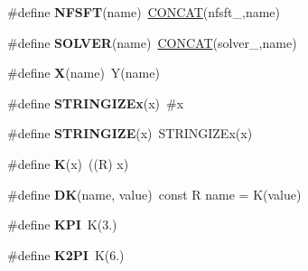 \begin{DoxyCompactItemize}
\item 
\hypertarget{group__nfftutil_gab3034d3ae1e6ab2dbc3aa6b640129338}{\#define {\bfseries N\-F\-S\-F\-T}(name)~\hyperlink{solver_8c_a04583350aeb5e936b6fb328093ad4e62}{C\-O\-N\-C\-A\-T}(nfsft\-\_\-,name)}\label{group__nfftutil_gab3034d3ae1e6ab2dbc3aa6b640129338}

\item 
\hypertarget{group__nfftutil_gaa98506b3390ef8e18f71ace66666d858}{\#define {\bfseries S\-O\-L\-V\-E\-R}(name)~\hyperlink{solver_8c_a04583350aeb5e936b6fb328093ad4e62}{C\-O\-N\-C\-A\-T}(solver\-\_\-,name)}\label{group__nfftutil_gaa98506b3390ef8e18f71ace66666d858}

\item 
\hypertarget{group__nfftutil_ga826edd40636cbaa44266b97c8c6a4fa3}{\#define {\bfseries X}(name)~Y(name)}\label{group__nfftutil_ga826edd40636cbaa44266b97c8c6a4fa3}

\item 
\hypertarget{group__nfftutil_ga7731fa5d9e9881a5be7b5ca52849f404}{\#define {\bfseries S\-T\-R\-I\-N\-G\-I\-Z\-Ex}(x)~\#x}\label{group__nfftutil_ga7731fa5d9e9881a5be7b5ca52849f404}

\item 
\hypertarget{group__nfftutil_ga3428692efe6051ef30016ffde1a9f7bb}{\#define {\bfseries S\-T\-R\-I\-N\-G\-I\-Z\-E}(x)~S\-T\-R\-I\-N\-G\-I\-Z\-Ex(x)}\label{group__nfftutil_ga3428692efe6051ef30016ffde1a9f7bb}

\item 
\hypertarget{group__nfftutil_gae5f839eceb66b42fe692d366c93a5bcc}{\#define {\bfseries K}(x)~((R) x)}\label{group__nfftutil_gae5f839eceb66b42fe692d366c93a5bcc}

\item 
\hypertarget{group__nfftutil_gaa88696ed510a29aeab8d976cbe8f7274}{\#define {\bfseries D\-K}(name, value)~const R name = K(value)}\label{group__nfftutil_gaa88696ed510a29aeab8d976cbe8f7274}

\item 
\hypertarget{group__nfftutil_ga00d0e13532a50be2e896a57d4555012d}{\#define {\bfseries K\-P\-I}~K(3.)}\label{group__nfftutil_ga00d0e13532a50be2e896a57d4555012d}

\item 
\hypertarget{group__nfftutil_gafcf5013eb5c0dcfb6d95a93868c84ab0}{\#define {\bfseries K2\-P\-I}~K(6.)}\label{group__nfftutil_gafcf5013eb5c0dcfb6d95a93868c84ab0}


\end{DoxyCompactItemize}
